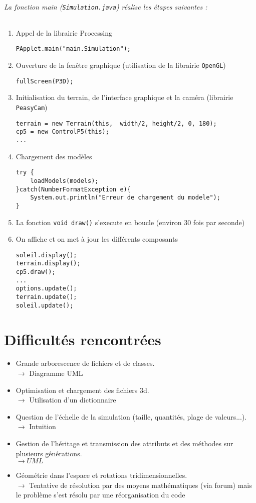 \documentclass[11pt,a4paper]{article}
\begin{document}
\paragraph{La fonction main (\texttt{Simulation.java}) réalise les étapes suivantes : \break}
\begin{enumerate}
\item{Appel de la librairie Processing}
\begin{lstlisting}
PApplet.main("main.Simulation");
\end{lstlisting}
\item{Ouverture de la fenêtre graphique (utilisation de la librairie \texttt{OpenGL})}
\begin{lstlisting}
fullScreen(P3D);
\end{lstlisting}
\item{Initialisation du terrain, de l'interface graphique et la caméra (librairie \texttt{PeasyCam})}
\begin{lstlisting}
terrain = new Terrain(this,  width/2, height/2, 0, 180);
cp5 = new ControlP5(this);
...
\end{lstlisting}
\item{Chargement des modèles}
\begin{lstlisting}
try {
	loadModels(models);
}catch(NumberFormatException e){
	System.out.println("Erreur de chargement du modele");
}
\end{lstlisting}
\newpage
\item{La fonction \texttt{void draw()} s'execute en boucle (environ 30 fois par seconde)}
\item{On affiche et on met à jour les différents composants}
\begin{lstlisting}
soleil.display();
terrain.display();
cp5.draw();
...
options.update();
terrain.update();
soleil.update();
\end{lstlisting}
\end{enumerate}

\part{Difficultés rencontrées}
\begin{itemize}
\item Grande arborescence de fichiers et de classes.
\\$\rightarrow$ Diagramme UML
\item Optimisation et chargement des fichiers 3d.
\\$\rightarrow$ Utilisation d'un dictionnaire
\item Question de l'échelle de la simulation (taille, quantités, plage de valeurs...).
\\$\rightarrow$ Intuition
\item Gestion de l'héritage et transmission des attributs et des méthodes sur plusieurs générations.
\\$\rightarrow UML$
\item Géométrie dans l'espace et rotations tridimensionnelles.
\\$\rightarrow$ Tentative de résolution par des moyens mathématiques (via forum) mais le problème s'est résolu par une réorganisation du code
\end{itemize}
\end{document}
